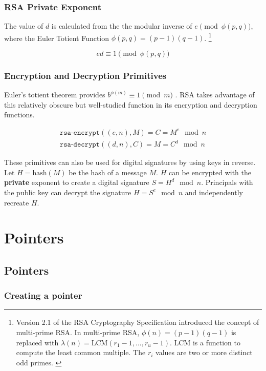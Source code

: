 \documentclass{book}
\begin{document}
\subsection{RSA Private Exponent}
The value of $d$ is calculated from the the modular inverse of $e \pmod{\phi(p,q)}$, where the Euler Totient Function $\phi(p,q)=(p-1)(q-1)$. \footnote{Version 2.1 of the RSA Cryptography Specification introduced the concept of multi-prime RSA. In multi-prime RSA, $\phi(n)=(p-1)(q-1)$ is replaced with $\lambda(n)=\textrm{LCM}(r_1 - 1, ... , r_u -1)$. LCM is a function to compute the least common multiple. The $r_i$ values are two or more distinct odd primes. \cite{rfc3447}}

\[
ed \equiv 1 \pmod{\phi(p,q)}
\]

\subsection{Encryption and Decryption Primitives}

Euler's totient theorem provides $b^{\phi(m)} \equiv 1 \pmod{m}$ \cite{weissteinModular}. RSA takes advantage of this relatively obscure but well-studied function in its encryption and decryption functions.

\begin{align*}
\texttt{rsa-encrypt}((e,n), M) = C = M^e \mod n \\
\texttt{rsa-decrypt}((d,n), C) = M = C^d \mod n
\end{align*}

These primitives can also be used for digital signatures by using keys in reverse. Let $H=\textrm{hash}(M)$ be the hash of a message $M$. $H$ can be encrypted with the \textbf{private} exponent to create a digital signature $S = H^d \mod n$. Principals with the public key can decrypt the signature $H = S^e \mod n$ and independently recreate $H$.

\chapter{Pointers}

\section{Pointers}

\subsection{Creating a pointer}
\end{document}

